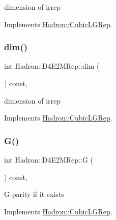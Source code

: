 dimension of irrep 

Implements \mbox{\hyperlink{structHadron_1_1CubicLGRep_a3acbaea26503ed64f20df693a48e4cdd}{Hadron\+::\+Cubic\+L\+G\+Rep}}.

\mbox{\label{structHadron_1_1D4E2MRep_a278a8c15aa90f5ca19d3ed547d94ed45}} 
\subsubsection{\texorpdfstring{dim()}{dim()}\hspace{0.1cm}{\footnotesize\ttfamily [3/3]}}
{\footnotesize\ttfamily int Hadron\+::\+D4\+E2\+M\+Rep\+::dim (\begin{DoxyParamCaption}{ }\end{DoxyParamCaption}) const\hspace{0.3cm}{\ttfamily [inline]}, {\ttfamily [virtual]}}

dimension of irrep 

Implements \mbox{\hyperlink{structHadron_1_1CubicLGRep_a3acbaea26503ed64f20df693a48e4cdd}{Hadron\+::\+Cubic\+L\+G\+Rep}}.

\mbox{\label{structHadron_1_1D4E2MRep_a8864f10fd71c4df8470c772f597564f6}} 
\subsubsection{\texorpdfstring{G()}{G()}\hspace{0.1cm}{\footnotesize\ttfamily [1/3]}}
{\footnotesize\ttfamily int Hadron\+::\+D4\+E2\+M\+Rep\+::G (\begin{DoxyParamCaption}{ }\end{DoxyParamCaption}) const\hspace{0.3cm}{\ttfamily [inline]}, {\ttfamily [virtual]}}

G-\/parity if it exists 

Implements \mbox{\hyperlink{structHadron_1_1CubicLGRep_ace26f7b2d55e3a668a14cb9026da5231}{Hadron\+::\+Cubic\+L\+G\+Rep}}.

\mbox{\label{structHadron_1_1D4E2MRep_a8864f10fd71c4df8470c772f597564f6}} 
